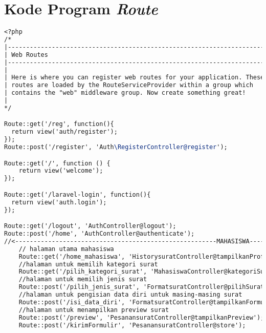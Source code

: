 \chapter{Kode Program \textit{Route}}
\label{lamp:E}

\begin{lstlisting}[language=tex,basicstyle=
\tiny,caption=web.php]
<?php
/*
|--------------------------------------------------------------------------
| Web Routes
|--------------------------------------------------------------------------
|
| Here is where you can register web routes for your application. These
| routes are loaded by the RouteServiceProvider within a group which
| contains the "web" middleware group. Now create something great!
|
*/

Route::get('/reg', function(){
  return view('auth/register');
});
Route::post('/register', 'Auth\RegisterController@register');

Route::get('/', function () {
    return view('welcome');
});

Route::get('/laravel-login', function(){
  return view('auth.login');
});

Route::get('/logout', 'AuthController@logout');
Route::post('/home', 'AuthController@authenticate');
//<-------------------------------------------------------MAHASISWA------------------------------------------------------->
    // halaman utama mahasiswa
    Route::get('/home_mahasiswa', 'HistorysuratController@tampilkanProfil');
    //halaman untuk memilih kategori surat
    Route::get('/pilih_kategori_surat', 'MahasiswaController@kategoriSurat');
    //halaman untuk memilih jenis surat
    Route::post('/pilih_jenis_surat', 'FormatsuratController@pilihSurat');
    //halaman untuk pengisian data diri untuk masing-masing surat
    Route::post('/isi_data_diri', 'FormatsuratController@tampilkanFormulir');
    //halaman untuk menampilkan preview surat
    Route::post('/preview', 'PesanansuratController@tampilkanPreview');
    Route::post('/kirimFormulir', 'PesanansuratController@store');
    

\end{lstlisting}
